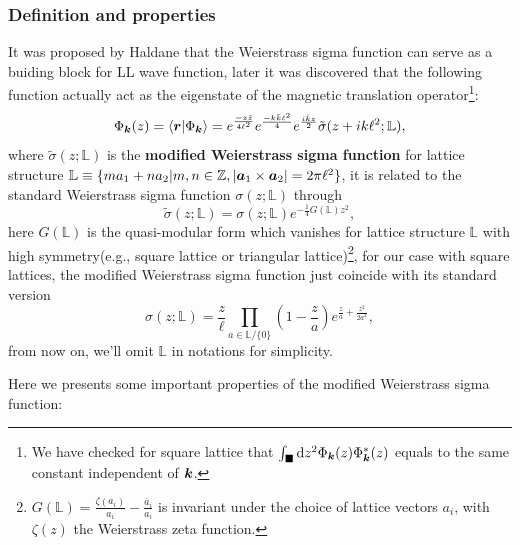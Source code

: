 \documentclass[%
nofootinbib,
 amsmath,amssymb,
 aps,onecolumn,
prb
]{revtex4-2}
\newcommand{\zz}{\bar{z}}
\newcommand{\tilsig}{\tilde{\sigma}}
\begin{document}
\subsubsection{Definition and properties}
It was proposed by Haldane\cite{HaldaneWeierstrass1,HaldaneWeierstrass2} that the Weierstrass sigma function can serve as a buiding block for LL wave function, later it was discovered\cite{2021JieWangPRL} that
the following function actually act as the eigenstate of the magnetic translation operator\footnote{We have checked for square lattice that $\int_{\blacksquare}\dd z^2 \Phi_{\vb*{k}}(z)\Phi^\ast_{\vb*{k}}(z)$ equals to the same constant independent of $\vb*{k}$.}:
\begin{equation}\label{BlochWaveFunctionWeier}
    \Phi_{\vb*{k}}(z)=\braket{\vb*{r}}{\Phi_{\vb*{k}}}=e^{\frac{-z\zz}{4\ell^2}}e^{\frac{-k\bar{k}\ell^2}{4}}e^{\frac{i\bar{k}z}{2}}\tilsig(z+ik\ell^2;\mathbb{L}),
\end{equation}
where $\tilsig(z;\mathbb{L})$ is the \textbf{modified Weierstrass sigma function} for lattice structure $\mathbb{L}\equiv\{ma_1+na_2|m,n\in\mathbb{Z},|\vb*{a}_1\times\vb*{a}_2|=2\pi\ell^2\}$, it is related to the standard Weierstrass sigma function $\sigma(z;\mathbb{L})$ through 
\begin{equation}
    \tilsig(z;\mathbb{L})=\sigma(z;\mathbb{L})e^{-\frac{1}{4}G(\mathbb{L})z^2},
\end{equation}
here $G(\mathbb{L})$ is the quasi-modular form which vanishes for lattice structure $\mathbb{L}$ with high symmetry(e.g., square lattice or triangular lattice)\footnote{$G(\mathbb{L})=\frac{\zeta(a_i)}{a_i}-\frac{\bar{a}_i}{a_i}$ is invariant under the choice of lattice vectors $a_i$, with $\zeta(z)$ the Weierstrass zeta function\cite{HaldaneWeierstrass1}.}, for our case with square lattices, the modified Weierstrass sigma function
just coincide with its standard version
\begin{equation}\label{WeierstrassSigma}
    \sigma(z;\mathbb{L})=\frac{z}{\ell}\prod_{a\in\mathbb{L}/\{0\}}\left(1-\frac{z}{a}\right)e^{\frac{z}{a}+\frac{z^2}{2a^2}},
\end{equation}
from now on, we'll omit $\mathbb{L}$ in notations for simplicity.\par 
Here we presents some important properties of the modified Weierstrass sigma function:
\end{document}
